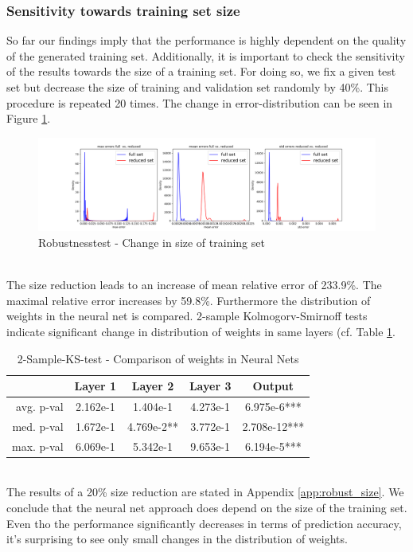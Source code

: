 \documentclass{article}
\begin{document}
\subsubsection{Sensitivity towards training set size} \label{sec:robust_size}
So far our findings imply that the performance is highly dependent on the quality of the generated training set. Additionally, it is important to check the sensitivity of the results towards the size of a training set. For doing so, we fix a given test set but decrease the size of training and validation set randomly by 40\%. This procedure is repeated 20 times. The change in error-distribution can be seen in Figure
\ref{fig:trainset_sensitivity}.
\begin{figure}[!ht]
    \centering
    \includegraphics[width=\textwidth]{RobustnessSize.png}
    \caption{Robustnesstest - Change in size of training set}
    \label{fig:trainset_sensitivity}
\end{figure}
  \\ 
The size reduction leads to an increase of mean relative error of 233.9\%. The maximal relative error increases by  59.8\%.  Furthermore the distribution of weights in the neural net is compared. 2-sample Kolmogorv-Smirnoff tests indicate significant change in distribution of weights in same layers (cf. Table \ref{tab:weights_size}. 
\begin{table}[!ht]
    \centering
    \begin{tabular}{|r|c|c|c|c|}\hline
     & Layer 1     &  Layer 2     & Layer 3 &    Output\\\hline
    avg. p-val & 2.162e-1 & 1.404e-1& 4.273e-1& 6.975e-6***\\\hline
    med. p-val & 1.672e-1 & 4.769e-2**& 3.772e-1& 2.708e-12***\\\hline
    max. p-val & 6.069e-1 & 5.342e-1& 9.653e-1& 6.194e-5***\\\hline
    \end{tabular}\vspace{0.1cm}
    \caption{2-Sample-KS-test - Comparison of weights in Neural Nets}
    \label{tab:weights_size}
\end{table}\\
The results of a 20\% size reduction are stated in Appendix \ref{app:robust_size}.
We conclude that the neural net approach does depend on the size of the training set. Even tho the performance significantly decreases 
in terms of prediction accuracy, it's surprising to see only small changes in the distribution of weights.
\end{document}
